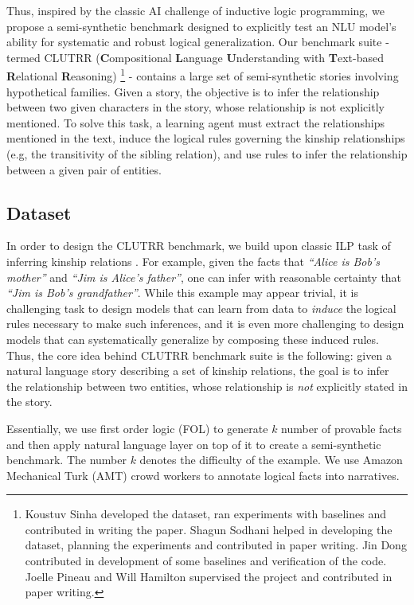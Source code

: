 \documentclass[12pt]{article}
\begin{document}
Thus, inspired by the classic AI challenge of inductive logic programming, we propose a semi-synthetic benchmark designed to explicitly test an NLU model's ability for systematic and robust logical generalization. Our benchmark suite - termed CLUTRR (\textbf{C}ompositional \textbf{L}anguage \textbf{U}nderstanding with \textbf{T}ext-based \textbf{R}elational \textbf{R}easoning) \cite{sinha2019a} \footnote{Koustuv Sinha developed the dataset, ran experiments with baselines and contributed in writing the paper. Shagun Sodhani helped in developing the dataset, planning the experiments and contributed in paper writing. Jin Dong contributed in development of some baselines and verification of the code. Joelle Pineau and Will Hamilton supervised the project and contributed in paper writing.} - contains a large set of semi-synthetic stories involving hypothetical families. Given a story, the objective is to infer the relationship between two given characters in the story, whose relationship is not explicitly mentioned. To solve this task, a learning agent must extract the relationships mentioned in the text, induce the logical rules governing the kinship relationships (e.g, the transitivity of the sibling relation), and use rules to infer the relationship between a given pair of entities.

\subsection{Dataset}

In order to design the CLUTRR benchmark, we build upon classic ILP task of inferring kinship relations \cite{hinton1986learning,muggleton1991inductive}. For example, given the facts that \textit{``Alice is Bob's mother''} and \textit{``Jim is Alice's father''}, one can infer with reasonable certainty that \textit{``Jim is Bob's grandfather''}. While this example may appear trivial, it is challenging task to design models that can learn from data to \textit{induce} the logical rules necessary to make such inferences, and it is even more challenging to design models that can systematically generalize by composing these induced rules. Thus, the core idea behind CLUTRR benchmark suite is the following: given a natural language story describing a set of kinship relations, the goal is to infer the relationship between two entities, whose relationship is \textit{not} explicitly stated in the story.

Essentially, we use first order logic (FOL) to generate $k$ number of provable facts and then apply natural language layer on top of it to create a semi-synthetic benchmark. The number $k$ denotes the difficulty of the example. We use Amazon Mechanical Turk (AMT) crowd workers to annotate logical facts into narratives.
\end{document}
